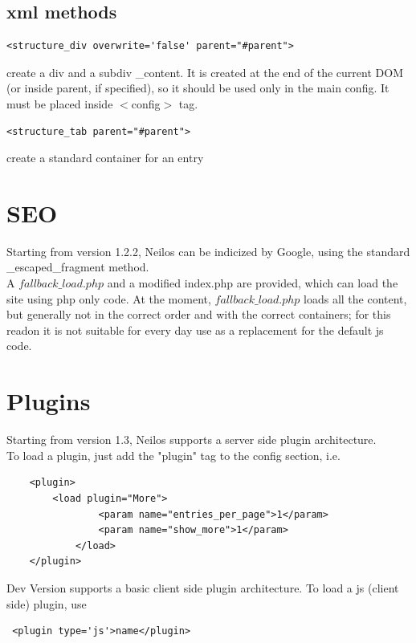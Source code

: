 \documentclass[a4paper,12pt]{article}
\begin{document}
\subsection{xml methods}
\begin{list}{-}{}
  \item \begin{verbatim}
<structure_div overwrite='false' parent="#parent">         
        \end{verbatim}
create a div and a subdiv \_content. It is created at the end of the current DOM (or inside parent, if specified), so it should be used only in the main config. It must be placed inside $<$config$>$ tag.
  \item \begin{verbatim}
<structure_tab parent="#parent">         
        \end{verbatim}
create a standard container for an entry
\end{list}

\section{SEO}
Starting from version 1.2.2, Neilos can be indicized by Google, using the standard \_escaped\_fragment method.\\
A $fallback\_load.php$ and a modified index.php are provided, which can load the site using php only code.
At the moment, $fallback\_load.php$ loads all the content, but generally not in the correct order and with the correct containers; for this readon it is not suitable for every day use as a replacement for the default js code.

\section{Plugins}
Starting from version 1.3, Neilos supports a server side plugin architecture.\\
To load a plugin, just add the "plugin" tag to the config section, i.e.
\begin{verbatim}
    <plugin>
	    <load plugin="More">
                <param name="entries_per_page">1</param>
                <param name="show_more">1</param>
            </load>
    </plugin>
        \end{verbatim}
Dev Version supports a basic client side plugin architecture. To load a js (client side) plugin, use
\begin{verbatim}
 <plugin type='js'>name</plugin>
\end{verbatim}
\end{document}
